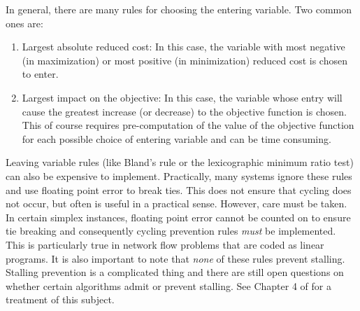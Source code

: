 In general, there are many rules for choosing the entering variable. Two common ones are:
\begin{enumerate}
\item Largest absolute reduced cost: In this case, the variable with most negative (in maximization) or most positive (in minimization) reduced cost is chosen to enter.

\item Largest impact on the objective: In this case, the variable whose entry will cause the greatest increase (or decrease) to the objective function is chosen. This of course requires pre-computation of the value of the objective function for each possible choice of entering variable and can be time consuming.
\end{enumerate}

Leaving variable rules (like Bland's rule or the lexicographic minimum ratio test) can also be expensive to implement. Practically, many systems ignore these rules and use floating point error to break ties. This does not ensure that cycling does not occur, but often is useful in a practical sense. However, care must be taken. In certain simplex instances, floating point error cannot be counted on to ensure tie breaking and consequently cycling prevention rules \textit{must} be implemented. This is particularly true in network flow problems that are coded as linear programs. It is also important to note that \textit{none} of these rules prevent stalling. Stalling prevention is a complicated thing and there are still open questions on whether certain algorithms admit or prevent stalling. See Chapter 4 of \cite{BJS04} for a treatment of this subject.